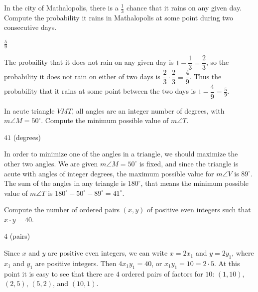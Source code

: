 \documentclass[11pt]{article}
\begin{document}
\begin{problem}%
In the city of Mathalopolis, there is a $\frac{1}{3}$ chance that it rains on any given day.
Compute the probability it rains in Mathalopolis at some point during two consecutive days.
\end{problem}

\begin{answer}
$\boxed{\frac{5}{9}}$
\end{answer}

\begin{solution}
The probaility that it does not rain on any given day is $1 - \dfrac{1}{3} = \dfrac{2}{3}$,
so the probability it does not rain on either of two days is 
$\dfrac{2}{3} \cdot \dfrac{2}{3} = \dfrac{4}{9}$. Thus the probability that it rains at
some point between the two days is $1 - \dfrac{4}{9} = \boxed{\frac{5}{9}}$.
\end{solution}


\begin{problem}
In acute triangle $VMT$, all angles are an integer number of degrees, 
with $m\angle M = 50^\circ$. Compute the minimum possible value of $m\angle T$.
\end{problem}

\begin{answer}
$\boxed{41}$ (degrees)
\end{answer}

\begin{solution}
In order to minimize one of the angles in a triangle, we should maximize the other two angles. 
We are given $m\angle M = 50^\circ$ is fixed, and since the triangle is acute with angles of
integer degrees, the maximum possible value for $m\angle V$ is $89^\circ$.
The sum of the angles in any triangle is $180^\circ$, that means the minimum possible
value of $m\angle T$ is $180^\circ - 50^\circ - 89^\circ = \boxed{41^\circ}$.
\end{solution}


\begin{problem}
Compute the number of ordered pairs $(x, y)$ of positive even integers such that $x \cdot y = 40$.
\end{problem}

\begin{answer}
$\boxed{4}$ (pairs)
\end{answer}

\begin{solution}
Since $x$ and $y$ are positive even integers, we can write $x = 2x_1$ and $y = 2y_1$, where 
$x_1$ and $y_1$ are positive integers. Then $4x_1y_1 = 40$, or $x_1y_1 = 10 = 2 \cdot 5$. 
At this point it is easy to see that there are $\boxed{4}$ ordered pairs of factors for $10$:
$(1, 10)$, $(2, 5)$, $(5, 2)$, and $(10, 1)$.
\end{solution}
\end{document}
